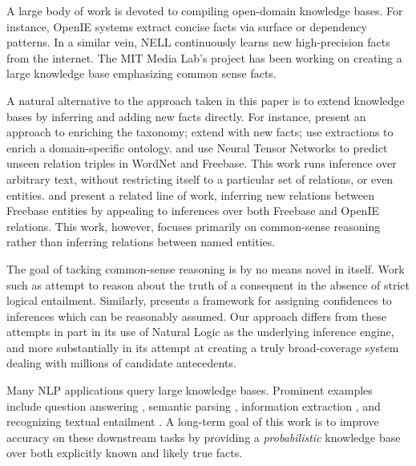 A large body of work is devoted to compiling open-domain knowledge
  bases.
For instance, OpenIE systems
  \cite{key:2007yates-textrunner,key:2011fader-reverb,key:2012mausam-ollie}
  extract concise facts via surface or dependency patterns.
In a similar vein, NELL \cite{key:2010carlson-nell,key:2013gardnerpra-nell}
  continuously learns new high-precision facts from the internet.
The MIT Media Lab's  project
  \cite{key:2004liu-conceptnet}
  has been working on creating a large knowledge base emphasizing
  common sense facts.

A natural alternative to the approach taken in this paper is to
  extend knowledge bases by inferring and adding new facts directly.
For instance,
   present an approach to enriching 
    the  taxonomy;
   extend  with new facts;
   use  extractions to 
    enrich a domain-specific ontology.
 and 
  use Neural Tensor Networks to predict unseen relation triples in
  WordNet and Freebase.
This work runs inference over arbitrary text, without restricting itself
  to a particular set of relations, or even entities.
 and 
  present a related line of work, inferring new relations between
  Freebase entities by appealing to inferences over both Freebase and
  OpenIE relations.
This work, however, focuses primarily on common-sense reasoning rather
  than inferring relations between named entities.


The goal of tacking common-sense reasoning is by no means novel in
  itself.
Work such as 
  attempt to reason about the truth of a consequent
  in the absence of strict logical entailment.
Similarly,  presents a framework for
  assigning confidences to inferences which can be reasonably assumed.
Our approach differs from these attempts in part in its use of Natural Logic
  as the underlying inference engine, and more substantially in its
  attempt at creating a truly broad-coverage system dealing with
  millions of candidate antecedents.

Many NLP applications query large knowledge bases.
Prominent examples include
  question answering
    \cite{key:2001voorhees-trec},
  semantic parsing
    \cite{key:1996zelle-semantics,key:2007zettlemoyer-semantics,key:2013kwiatkowski-semantics,key:2014berant-semantics},
  information extraction
    \cite{key:2011hoffman-kbp,key:2012surdeanu-mimlre},
  and recognizing textual entailment
    \cite{key:2010-schoenmackers-horn,key:2011berant-entailment}.
A long-term goal of this work is to improve accuracy on these
  downstream tasks by providing a \textit{probabilistic} knowledge base
  over both explicitly known and likely true facts.

